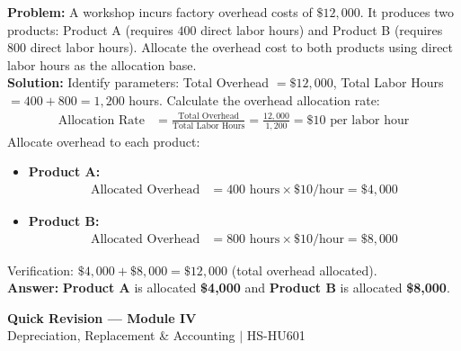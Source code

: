 \documentclass[12pt,a4paper]{article}
\begin{document}
\begin{tcolorbox}[examplebox, title={Example 3: Indirect Cost Allocation}]
\textbf{Problem:} A workshop incurs factory overhead costs of $\$12,000$. It produces two products: Product A (requires $400$ direct labor hours) and Product B (requires $800$ direct labor hours). Allocate the overhead cost to both products using direct labor hours as the allocation base.\\[4pt]
\textbf{Solution:}
Identify parameters: Total Overhead $= \$12,000$, Total Labor Hours $= 400 + 800 = 1,200$ hours.
Calculate the overhead allocation rate:
\begin{align*}
  \text{Allocation Rate} &= \frac{\text{Total Overhead}}{\text{Total Labor Hours}} = \frac{12,000}{1,200} = \$10 \text{ per labor hour}
\end{align*}
Allocate overhead to each product:
\begin{itemize}[leftmargin=*, itemsep=8pt]
  \item \textbf{Product A:}
    \begin{align*}
      \text{Allocated Overhead} &= 400 \text{ hours} \times \$10/\text{hour} = \$4,000
    \end{align*}
  \item \textbf{Product B:}
    \begin{align*}
      \text{Allocated Overhead} &= 800 \text{ hours} \times \$10/\text{hour} = \$8,000
    \end{align*}
\end{itemize}
Verification: $\$4,000 + \$8,000 = \$12,000$ (total overhead allocated).\\[4pt]
\textbf{Answer:} \textbf{Product A} is allocated \textbf{\$4,000} and \textbf{Product B} is allocated \textbf{\$8,000}.
\end{tcolorbox}

\newpage
\begin{center}
  {\large\bfseries\color{myred} Quick Revision --- Module IV}\\[3pt]
  {\small\color{mydark} Depreciation, Replacement \& Accounting $|$ HS-HU601}
\end{center}
\noindent{\color{myred}\rule{\linewidth}{1.2pt}}
\vspace{4pt}
\end{document}
